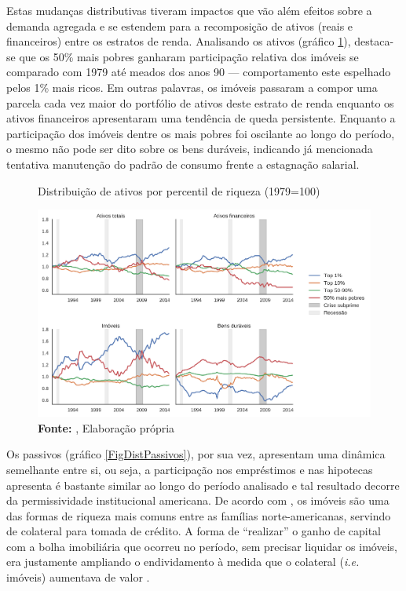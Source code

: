 Estas mudanças distributivas tiveram impactos que vão além efeitos sobre a demanda agregada e se estendem para a recomposição de ativos (reais e financeiros) entre os estratos de renda.
Analisando os ativos (gráfico \ref{FigDistAtivos}), destaca-se que os 50\% mais pobres ganharam participação relativa dos imóveis se comparado com 1979 até meados dos anos 90 ---  comportamento este espelhado pelos 1\% mais ricos. 
Em outras palavras, os imóveis passaram a compor uma parcela cada vez maior do portfólio de ativos deste estrato de renda enquanto os ativos financeiros apresentaram uma tendência de queda persistente.
Enquanto a participação dos imóveis dentre os mais pobres foi oscilante ao longo do período, o mesmo não pode ser dito sobre os bens duráveis, indicando já mencionada tentativa manutenção do padrão de consumo frente a estagnação salarial.


\begin{figure}[H]
	\centering
	\caption{Distribuição de ativos por percentil de riqueza (1979=100)}
	\label{FigDistAtivos}
	\includegraphics[width=\textwidth]{../../Dados/Fatos_Estilizados/figs/Distribuicao_Ativos.png}
	\caption*{\textbf{Fonte:} \textcite{us_census_bureau_characteristics_2017}, Elaboração própria}
\end{figure}

Os passivos (gráfico \ref{FigDistPassivos}), por sua vez, apresentam uma dinâmica semelhante entre si, ou seja, a participação nos empréstimos e nas hipotecas apresenta é bastante similar ao longo do período analisado e tal resultado decorre da permissividade institucional americana.
De acordo com \textcite{teixeira_uma_2011}, os imóveis são uma das formas de riqueza mais comuns entre as famílias norte-americanas, servindo de colateral para tomada de crédito. A forma de ``realizar'' o ganho de capital com a bolha imobiliária que ocorreu no período, sem precisar liquidar os imóveis, era justamente ampliando o endividamento à medida que o colateral (\textit{i.e.} imóveis) aumentava de valor \cite{teixeira_crescimento_2015}. 


